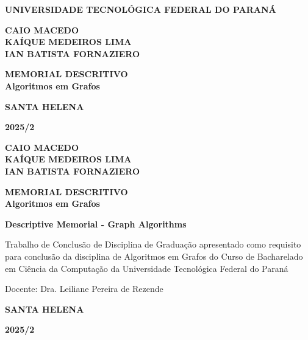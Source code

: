 \newcommand{\universidade}{UNIVERSIDADE TECNOLÓGICA FEDERAL DO PARANÁ}
\newcommand{\autores}{CAIO MACEDO\\ KAÍQUE MEDEIROS LIMA\\ IAN BATISTA FORNAZIERO}
\newcommand{\titulo}{MEMORIAL DESCRITIVO\\Algoritmos em Grafos}
\newcommand{\english}{Descriptive Memorial - Graph Algorithms}
\newcommand{\docente}{Dra. Leiliane Pereira de Rezende}
\newcommand{\cidade}{SANTA HELENA}
\newcommand{\periodo}{2025/2}


	
	\begin{titlepage}
		\centering
		{\bf \universidade\par}
		\vspace{4cm}
		{\bf\autores\par}
		\vspace{6cm}
		{\bf\titulo\par}
		\vspace{9cm}
		{\bf\cidade\par}
		{\bf\periodo\par}
		\newpage
		
		{\bf\autores\par}
		\vspace{3.5cm}
		{\bf\titulo\par}
		\vspace{2cm}
		{\bf\english\par}
		\vspace{3cm}
		\begin{flushright} %
			\begin{minipage}{0.5\textwidth} %
				\justifying %
				\noindent
				Trabalho de Conclusão de Disciplina de
				Graduação apresentado como requisito para
				conclusão da disciplina de Algoritmos em
				Grafos do Curso de Bacharelado em Ciência
				da Computação da Universidade Tecnológica
				Federal do Paraná
				
				\vspace{1em}
				\noindent
				Docente: Dra. Leiliane Pereira de Rezende
			\end{minipage}
		\end{flushright}
		\vspace{5cm}
		{\bf\cidade\par}
		{\bf\periodo\par}
		\thispagestyle{empty}
	\end{titlepage}
	\newpage
	\setcounter{page}{1}
